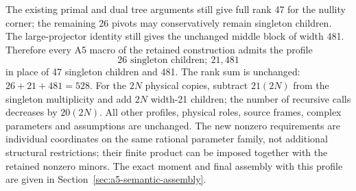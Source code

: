 The existing primal and dual tree arguments still give full rank 47 for
the nullity corner; the remaining 26 pivots may conservatively remain
singleton children. The large-projector identity still gives the
unchanged middle block of width 481. Therefore every A5 macro of the
retained construction admits the profile
\[
 \boxed{26\text{ singleton children};\ 21,481}
\]
in place of 47 singleton children and 481. The rank sum is unchanged:
$26+21+481=528$. For the $2N$ physical copies, subtract $21(2N)$ from
the singleton multiplicity and add $2N$ width-21 children; the number of
recursive calls decreases by $20(2N)$. All other profiles, physical
roles, source frames, complex parameters and assumptions are unchanged.
The new nonzero requirements are individual coordinates on the same
rational parameter family, not additional structural restrictions; their
finite product can be imposed together with the retained nonzero minors.
The exact moment and final assembly with this profile are given in
Section~\ref{sec:a5-semantic-assembly}.
